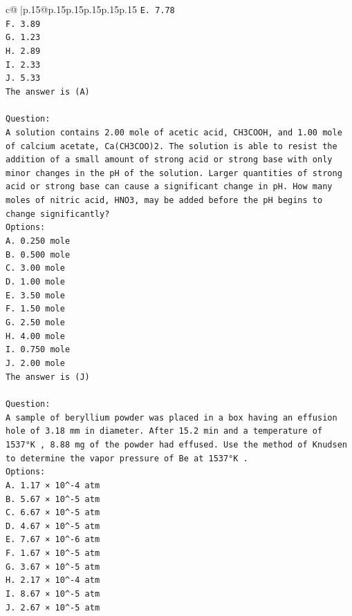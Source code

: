 \documentclass{article}
\begin{document}
{\begin{supertabular}{c@{$\;$}|p{.15\linewidth}@{}p{.15\linewidth}p{.15\linewidth}p{.15\linewidth}p{.15\linewidth}p{.15\linewidth}}
{{{\texttt{E. 7.78} \\
\texttt{F. 3.89} \\
\texttt{G. 1.23} \\
\texttt{H. 2.89} \\
\texttt{I. 2.33} \\
\texttt{J. 5.33} \\
\texttt{The answer is (A)} \\
\\ 
\texttt{Question:} \\
\texttt{A solution contains 2.00 mole of acetic acid, CH3COOH, and 1.00 mole of calcium acetate, Ca(CH3COO)2. The solution is able to resist the addition of a small amount of strong acid or strong base with only minor changes in the pH of the solution. Larger quantities of strong acid or strong base can cause a significant change in pH. How many moles of nitric acid, HNO3, may be added before the pH begins to change significantly?} \\
\texttt{Options:} \\
\texttt{A. 0.250 mole} \\
\texttt{B. 0.500 mole} \\
\texttt{C. 3.00 mole} \\
\texttt{D. 1.00 mole} \\
\texttt{E. 3.50 mole} \\
\texttt{F. 1.50 mole} \\
\texttt{G. 2.50 mole} \\
\texttt{H. 4.00 mole} \\
\texttt{I. 0.750 mole} \\
\texttt{J. 2.00 mole} \\
\texttt{The answer is (J)} \\
\\ 
\texttt{Question:} \\
\texttt{A sample of beryllium powder was placed in a box having an effusion hole of 3.18 mm in diameter. After 15.2 min and a temperature of 1537°K , 8.88 mg of the powder had effused. Use the method of Knudsen to determine the vapor pressure of Be at 1537°K .} \\
\texttt{Options:} \\
\texttt{A. 1.17 × 10\^{}{-}4 atm} \\
\texttt{B. 5.67 × 10\^{}{-}5 atm} \\
\texttt{C. 6.67 × 10\^{}{-}5 atm} \\
\texttt{D. 4.67 × 10\^{}{-}5 atm} \\
\texttt{E. 7.67 × 10\^{}{-}6 atm} \\
\texttt{F. 1.67 × 10\^{}{-}5 atm} \\
\texttt{G. 3.67 × 10\^{}{-}5 atm} \\
\texttt{H. 2.17 × 10\^{}{-}4 atm} \\
\texttt{I. 8.67 × 10\^{}{-}5 atm} \\
\texttt{J. 2.67 × 10\^{}{-}5 atm} \\
            }
        }
    }
     \\ \\


\end{supertabular}}
\end{document}
